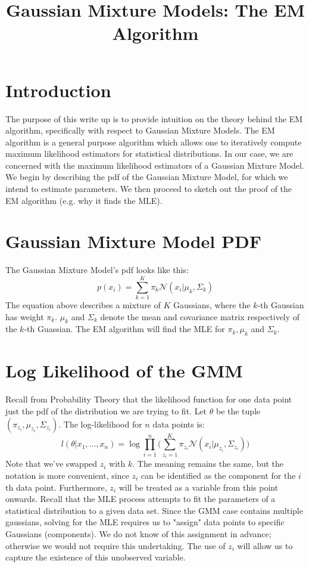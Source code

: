 \documentclass{article}
\title{Gaussian Mixture Models: The EM Algorithm}
\begin{document}
\maketitle

\section{Introduction}
The purpose of this write up is to provide intuition on the theory behind the EM algorithm, specifically with respect to Gaussian Mixture Models. The EM algorithm is a general purpose algorithm which allows one to iteratively compute maximum likelihood estimators for statistical distributions. In our case, we are concerned with the maximum likelihood estimators of a Gaussian Mixture Model. We begin by describing the pdf of the Gaussian Mixture Model, for which we intend to estimate parameters. We then proceed to sketch out the proof of the EM algorithm (e.g. why it finds the MLE).

\section{Gaussian Mixture Model PDF}
The Gaussian Mixture Model's pdf looks like this:
\begin{equation}
	p(x_{i}) = \sum\limits_{k = 1}^{K} \pi_{k} \mathcal{N}(x_{i} | \mu_{k}, \Sigma_{k})
\end{equation}
The equation above describes a mixture of $K$ Gaussians, where the $k$-th Gaussian has weight $\pi_{k}$. $\mu_{k}$ and $\Sigma_{k}$ denote the mean and covariance matrix respectively of the $k$-th Guassian. The EM algorithm will find the MLE for $\pi_{k}, \mu_{k}$ and $\Sigma_{k}$.

\section{Log Likelihood of the GMM}
Recall from Probability Theory that the likelihood function for one data point just the pdf of the distribution we are trying to fit. Let $\theta$ be the tuple $(\pi_{z_{i}}, \mu_{z_{i}}, \Sigma_{z_{i}})$. The log-likelihood for $n$ data points is:
\begin{equation}
	l(\theta | x_{1}, \ldots, x_{n}) = \log \prod_{i = 1}^{n} \Bigg(\sum\limits_{z_{i} = 1}^{K} \pi_{z_{i}} \mathcal{N}(x_{i} | \mu_{z_{i}}, \Sigma_{z_{i}}) \Bigg)
\end{equation}
Note that we've swapped $z_{i}$ with $k$. The meaning remains the same, but the notation is more convenient, since $z_{i}$ can be identified as the component for the $i$th data point. Furthermore, $z_{i}$ will be treated as a variable from this point onwards. Recall that the MLE process attempts to fit the parameters of a statistical distribution to a given data set. Since the GMM case contains multiple gaussians, solving for the MLE requires us to "assign" data points to specific Gaussians (components). We do not know of this assignment in advance; otherwise we would not require this undertaking. The use of $z_{i}$ will allow us to capture the existence of this unobserved variable.
\end{document}
